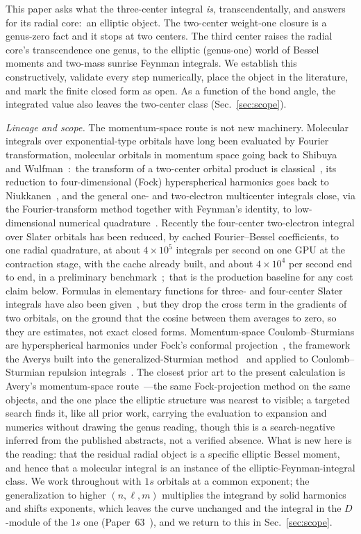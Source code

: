 \documentclass[aps,pra,twocolumn,superscriptaddress,longbibliography]{revtex4-2}
\begin{document}
This paper asks what the three-center integral \emph{is}, transcendentally,
and answers for its radial core:\ an elliptic object.  The two-center weight-one closure is
a genus-zero fact and it stops at two centers.  The third center raises the
radial core's transcendence one genus, to the elliptic (genus-one) world of Bessel moments
and two-mass sunrise Feynman integrals.  We establish this constructively,
validate every step numerically, place the object in the literature, and mark
the finite closed form as open.  As a function of the bond angle, the integrated value also
leaves the two-center class (Sec.~\ref{sec:scope}).

\emph{Lineage and scope.}  The momentum-space route is not new machinery.
Molecular integrals over exponential-type orbitals have long been evaluated by
Fourier transformation, molecular orbitals in momentum space going back to
Shibuya and Wulfman~\cite{shibuya1965}:\ the transform of a two-center orbital
product is classical~\cite{trivedi_steinborn1983}, its reduction to
four-dimensional (Fock)
hyperspherical harmonics goes back to Niukkanen~\cite{niukkanen1984}, and the
general one- and two-electron multicenter integrals close, via the
Fourier-transform method together with Feynman's identity, to low-dimensional
numerical quadrature~\cite{grotendorst_steinborn1988}.  Recently the
four-center two-electron integral over Slater orbitals has been reduced, by
cached Fourier--Bessel coefficients, to one radial quadrature, at about
$4\times10^{5}$ integrals per second on one GPU at the contraction stage, with the
cache already built, and about $4\times10^{4}$ per second end to end, in a preliminary
benchmark~\cite{chen2026fourier};\ that is the production baseline for any
cost claim below.  Formulas in elementary functions for three- and four-center
Slater integrals have also been given~\cite{novosadov2025}, but they drop the
cross term in the gradients of two orbitals, on the ground that the cosine
between them averages to zero, so they are estimates, not exact closed forms.
Momentum-space
Coulomb--Sturmians are hyperspherical harmonics under Fock's conformal
projection~\cite{fock1935}, the framework the Averys built into the
generalized-Sturmian method~\cite{avery1989,avery2006,avery_avery2015} and
applied to Coulomb--Sturmian repulsion
integrals~\cite{avery_avery_4center}.  The closest prior art to the present
calculation is Avery's momentum-space route~\cite{avery2013}---the same
Fock-projection method on the same objects, and the one place the elliptic
structure was nearest to visible; a targeted search finds it, like all prior
work, carrying the evaluation to expansion and numerics without drawing the
genus reading, though this is a search-negative inferred from the published
abstracts, not a verified absence.  What is new here is the reading: that the residual radial object is a
specific elliptic Bessel moment, and hence that a molecular integral is an
instance of the elliptic-Feynman-integral class.  We work throughout with $1s$ orbitals at a
common exponent; the generalization to higher $(n,\ell,m)$ multiplies the
integrand by solid harmonics and shifts exponents, which leaves the curve
unchanged and the integral in the $D$-module of the $1s$ one
(Paper~63~\cite{loutey_paper63}), and we return to this in
Sec.~\ref{sec:scope}.
\end{document}
